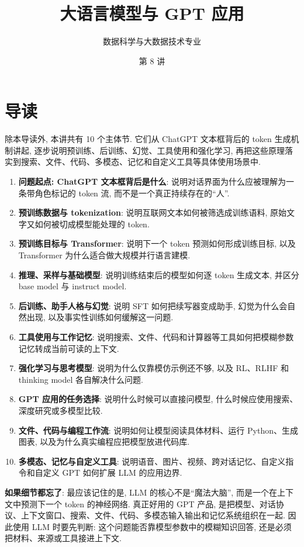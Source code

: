 \documentclass{../nndlcourse}
\begin{document}
\title{大语言模型与 GPT 应用}
\author{数据科学与大数据技术专业}
\date{第 8 讲}
\maketitle

\section{导读}

除本导读外, 本讲共有 10 个主体节. 它们从 ChatGPT 文本框背后的 token 生成机制讲起, 逐步说明预训练、后训练、幻觉、工具使用和强化学习, 再把这些原理落实到搜索、文件、代码、多模态、记忆和自定义工具等具体使用场景中.

\begin{enumerate}
  \item \textbf{问题起点: ChatGPT 文本框背后是什么}: 说明对话界面为什么应被理解为一条带角色标记的 token 流, 而不是一个真正持续存在的“人”.
  \item \textbf{预训练数据与 tokenization}: 说明互联网文本如何被筛选成训练语料, 原始文字又如何被切成模型能处理的 token.
  \item \textbf{预训练目标与 Transformer}: 说明下一个 token 预测如何形成训练目标, 以及 Transformer 为什么适合做大规模并行语言建模.
  \item \textbf{推理、采样与基础模型}: 说明训练结束后的模型如何逐 token 生成文本, 并区分 base model 与 instruct model.
  \item \textbf{后训练、助手人格与幻觉}: 说明 SFT 如何把续写器变成助手, 幻觉为什么会自然出现, 以及事实性训练如何缓解这一问题.
  \item \textbf{工具使用与工作记忆}: 说明搜索、文件、代码和计算器等工具如何把模糊参数记忆转成当前可读的上下文.
  \item \textbf{强化学习与思考模型}: 说明为什么仅靠模仿示例还不够, 以及 RL、RLHF 和 thinking model 各自解决什么问题.
  \item \textbf{GPT 应用的任务选择}: 说明什么时候可以直接问模型, 什么时候应使用搜索、深度研究或多模型比较.
  \item \textbf{文件、代码与编程工作流}: 说明如何让模型阅读具体材料、运行 Python、生成图表, 以及为什么真实编程应把模型放进代码库.
  \item \textbf{多模态、记忆与自定义工具}: 说明语音、图片、视频、跨对话记忆、自定义指令和自定义 GPT 如何扩展 LLM 的应用边界.
\end{enumerate}

\textbf{如果细节都忘了}: 最应该记住的是, LLM 的核心不是“魔法大脑”, 而是一个在上下文中预测下一个 token 的神经网络. 真正好用的 GPT 产品, 是把模型、对话协议、上下文窗口、搜索、文件、代码、多模态输入输出和记忆系统组织在一起. 因此使用 LLM 时要先判断: 这个问题能否靠模型参数中的模糊知识回答, 还是必须把材料、来源或工具接进上下文.
\end{document}
